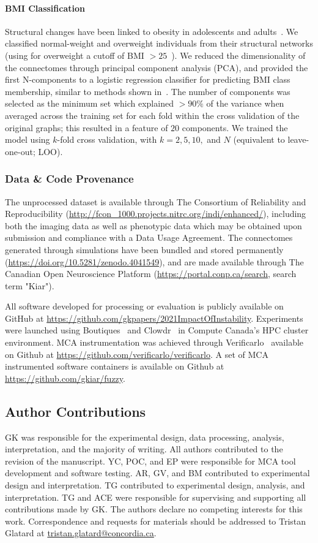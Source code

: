 \documentclass[fleqn,10pt]{SelfArx} %
\begin{document}
\paragraph{BMI Classification} Structural changes have been linked to obesity in adolescents and
adults~\cite{Raji2010-lh}. We classified normal-weight and overweight individuals from their structural networks (using
for overweight a cutoff of BMI $> 25$~\cite{Gupta2015-ap}). We reduced the dimensionality of the connectomes through
principal component analysis (PCA), and provided the first N-components to a logistic regression classifier for
predicting BMI class membership, similar to methods shown in~\cite{Gupta2015-ap,Park2015-uj}. The number of components
was selected as the minimum set which explained $> 90\%$ of the variance when averaged across the training set for each
fold within the cross validation of the original graphs; this resulted in a feature of $20$ components. We trained the
model using $k$-fold cross validation, with $k = 2, 5, 10,$ and $N$ (equivalent to leave-one-out; LOO).

\subsubsection*{Data \& Code Provenance}
The unprocessed dataset is available through The Consortium of Reliability and Reproducibility
(\url{http://fcon_1000.projects.nitrc.org/indi/enhanced/}), including both the imaging data as well as phenotypic data
which may be obtained upon submission and compliance with a Data Usage Agreement. The connectomes generated through
simulations have been bundled and stored permanently (\url{https://doi.org/10.5281/zenodo.4041549}), and are made
available through The Canadian Open Neuroscience Platform (\url{https://portal.conp.ca/search}, search term "Kiar").

All software developed for processing or evaluation is publicly available on GitHub at
\url{https://github.com/gkpapers/2021ImpactOfInstability}. Experiments were launched using
Boutiques~\cite{Glatard2018-tu} and Clowdr~\cite{Kiar2019-sr} in Compute Canada's HPC cluster environment. MCA
instrumentation was achieved through Verificarlo~\cite{Denis2016-wo} available on Github at
\url{https://github.com/verificarlo/verificarlo}. A set of MCA instrumented software containers is available on Github
at \url{https://github.com/gkiar/fuzzy}.


\subsection*{Author Contributions}
GK was responsible for the experimental design, data processing, analysis, interpretation, and the majority of writing.
All authors contributed to the revision of the manuscript. YC, POC, and EP were responsible for MCA tool development
and software testing. AR, GV, and BM contributed to experimental design and interpretation. TG contributed to
experimental design, analysis, and interpretation. TG and ACE were responsible for supervising and supporting all
contributions made by GK. The authors declare no competing interests for this work. Correspondence and requests for
materials should be addressed to Tristan Glatard at \url{tristan.glatard@concordia.ca}.
\end{document}
